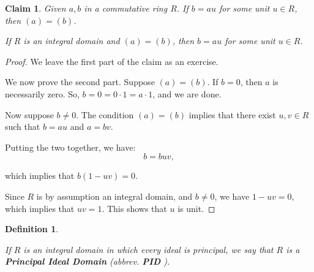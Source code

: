 \documentclass[a4paper,12pt]{report}
\newcounter{statement}
\numberwithin{statement}{chapter}
\newtheorem{defn}[statement]{Definition}
\newtheorem{claim}[statement]{Claim}
\numberwithin{equation}{chapter}
\numberwithin{section}{chapter}
\numberwithin{subsection}{section}
\begin{document}
\begin{claim}
Given $a, b$ in a commutative ring $R$.  If $b = au$ for some unit $u \in R$,
then $(a) = (b)$.



If $R$ is an integral domain and $(a) = (b)$, then $b = au$ for some unit $u \in R$.
\end{claim}
\begin{proof}

We leave the first part of the claim as an exercise.





We now prove the second part.  Suppose $(a) = (b)$.  If $b = 0$,
then $a$ is necessarily zero.  So, $b = 0 = 0\cdot 1 = a \cdot 1$, and we are done.


Now suppose $b \neq 0$.  The condition $(a) = (b)$
implies that there exist $u, v \in R$ such that $b = au$ and $a = bv$.


Putting the two together, we have:
\[
b = buv,
\]

which implies that $b(1 - uv) = 0$.


Since $R$ is by assumption an integral domain,
and $b \neq 0$, we have $1 - uv = 0$, which implies that $uv = 1$.
This shows that $u$ is unit.


\end{proof}




\begin{defn}
\label{def:pid}


If $R$ is an integral domain in which every ideal is principal,
we say that $R$ is a  {\bf Principal Ideal Domain} 
(abbrev.  {\bf PID} ).
\end{defn}
\end{document}
